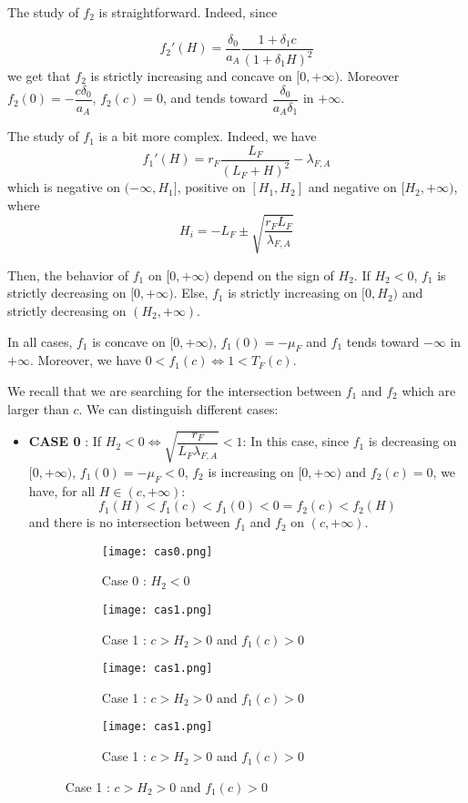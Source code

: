 \documentclass{article}
\newcommand{\lfa}{\lambda_{F, A}}
\begin{document}
\begin{appendices}
The study of $f_2$ is straightforward. Indeed, since

$$
f_2'(H) = \dfrac{\delta_0}{a_A} \dfrac{1 + \delta_1 c}{(1 + \delta_1 H)^2}
$$
we get that $f_2$ is strictly increasing and concave on $[0, +\infty)$. Moreover $f_2(0) = - \dfrac{c \delta_0}{a_A}$, $f_2(c) = 0$, and tends toward $\dfrac{\delta_0}{a_A \delta_1}$ in $+ \infty$.

The study of $f_1$ is a bit more complex. 
Indeed, we have 
$$
f_1'(H) = r_F \dfrac{L_F}{(L_F + H)^2} - \lfa
$$
 which is negative on  $(-\infty, H_1 ]$, positive on $[H_1, H_2]$ and negative on $[H_2, +\infty)$, where   
$$
H_i = -L_F \pm \sqrt{\dfrac{r_F L_F}{\lfa}}
$$

Then, the behavior of $f_1$ on $[0, +\infty)$ depend on the sign of $H_2$. 
If $H_2 < 0$, $f_1$ is strictly decreasing on $[0, +\infty)$. Else, $f_1$ is strictly increasing on $[0, H_2)$ and strictly decreasing on $(H_2, + \infty)$.

In all cases, $f_1$ is concave on $[0, + \infty)$, $f_1(0) = - \mu_F$ and $f_1$ tends toward $-\infty$ in $+\infty$. Moreover, we have $0 < f_1(c) \Leftrightarrow 1 < T_F(c)$.

We recall that we are searching for the intersection between $f_1$ and $f_2$ which are larger than $c$. We can distinguish different cases:

\begin{itemize}
\item \textbf{CASE 0} : If $H_2 < 0 \Leftrightarrow \sqrt{\dfrac{r_F}{L_F \lfa} } < 1$:
In this case, since $f_1$ is decreasing on $[0, +\infty)$,  $f_1(0) = - \mu_F < 0$, $f_2$ is increasing on $[0, +\infty)$ and $f_2(c) = 0$, we have, for all $H \in (c, +\infty)$:
\begin{equation*}
f_1(H) < f_1(c) < f_1(0) < 0 = f_2(c) < f_2(H)
\end{equation*}
and there is no intersection between $f_1$ and $f_2$ on $(c, + \infty)$.

\begin{figure}[!ht]
\centering
\begin{subfigure}[b]{0.4\textwidth}
\texttt{[image: cas0.png]}
\caption{Case 0 : $H_2 < 0$}
\end{subfigure}
\begin{subfigure}[b]{0.4\textwidth}
\texttt{[image: cas1.png]}
\caption{Case 1 : $c > H_2 > 0$ and $f_1(c) > 0$}
\end{subfigure}
\hfill
\begin{subfigure}[b]{0.4\textwidth}
\texttt{[image: cas1.png]}
\caption{Case 1 : $c > H_2 > 0$ and $f_1(c) > 0$}
\end{subfigure}
\begin{subfigure}[b]{0.4\textwidth}
\texttt{[image: cas1.png]}
\caption{Case 1 : $c > H_2 > 0$ and $f_1(c) > 0$}
\end{subfigure}
\end{figure}


\end{itemize}
\end{appendices}
\end{document}

